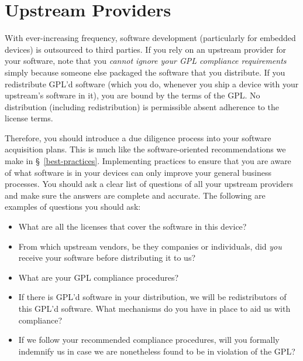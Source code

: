 
\section{Upstream Providers}
\label{upstream}

With ever-increasing frequency, software development (particularly for
embedded devices) is outsourced to third parties.  If you rely on an
upstream provider for your software, note that you \emph{cannot ignore
  your GPL compliance requirements} simply because someone else packaged
the software that you distribute.  If you redistribute GPL'd software
(which you do, whenever you ship a device with your upstream's software in
it), you are bound by the terms of the GPL\@.  No distribution (including
redistribution) is permissible absent adherence to the license terms.

Therefore, you should introduce a due diligence process into your software
acquisition plans.  This is much like the software-oriented
recommendations we make in \S~\ref{best-practices}.  Implementing
practices to ensure that you are aware of what software is in your devices
can only improve your general business processes.  You should ask a clear
list of questions of all your upstream providers and make sure the answers
are complete and accurate.  The following are examples of questions you
should ask:
\begin{itemize}

\item What are all the licenses that cover the software in this device?

\item From which upstream vendors, be they companies or individuals, did
  \emph{you} receive your software before distributing it to us?

\item What are your GPL compliance procedures?

\item If there is GPL'd software in your distribution, we will be
  redistributors of this GPL'd software.  What mechanisms do you have in
  place to aid us with compliance?

\item If we follow your recommended compliance procedures, will you
  formally indemnify us in case we are nonetheless found to be in
  violation of the GPL?

\end{itemize}

